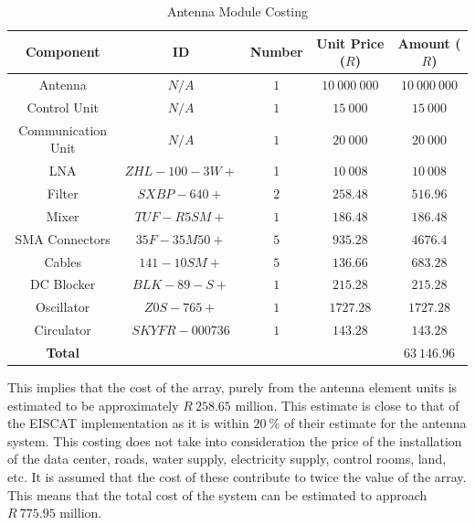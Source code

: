 \documentclass[11pt]{witseiepaper}
\begin{document}
\begin{bibunit}[witseie]
\begin{table}[htb]
    \caption{Antenna Module Costing}
    \label{tab:CostingUnit}
    \begin{center}
        \begin{tabular}{c c c c c}
            \hline 
            Component & ID & Number & Unit Price ($R$) & Amount ($R$) \\
            \hline
            Antenna & $N/A$ & $1$ & $10~000~000$ & $10~000~000$ \\
            Control Unit & $N/A$ & $1$ & $15~000$ & $15~000$ \\
            Communication Unit & $N/A$ & $1$ & $20~000$ & $20~000$ \\

            LNA & $ZHL-100-3W+$ \cite{LNA} & 1 & $10~008$ & $10~008$ \\
            Filter & $SXBP-640+$ \cite{Filter} & $2$ & $258.48$ & $516.96$ \\
            Mixer & $TUF-R5SM+$ \cite{Mixer} & $1$ & $186.48$ & $186.48$ \\
            SMA Connectors & $35F-35M50+$ \cite{SMA} & $5$ & $935.28$ & $4676.4$ \\
            Cables & $141-10SM+$ \cite{Cables} & $5$ & $136.66$ & $683.28$ \\
            DC Blocker & $BLK-89-S+$ \cite{DCBlocker} & $1$ & $215.28$ & $215.28$ \\
            Oscillator & $Z0S-765+$ \cite{Oscillator} & $1$ & $1727.28$ & $1727.28$ \\
            Circulator & $SKYFR-000736$ \cite{Circulator} & $1$ & $143.28$ & $143.28$ \\  
            \hline
            \textbf{Total} & & & & \textbf{$63~146.96$} \\ 
            \hline
        \end{tabular}
    \end{center}
\end{table}
This implies that the cost of the array, purely from the antenna element units is estimated to be approximately $R~258.65$ million. This estimate is close to that of the EISCAT implementation as it is within $20~\%$ of their estimate for the antenna system.
This costing does not take into consideration the price of the installation of the data center, roads, water supply, electricity supply, control rooms, land, etc. It is assumed that the cost of these contribute to twice the value of the array.
This means that the total cost of the system can be estimated to approach $R~775.95$ million.






\end{bibunit}
\end{document}
